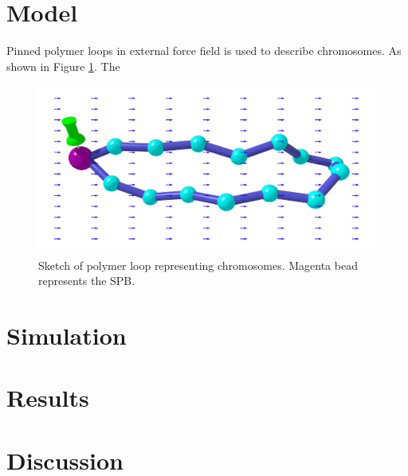 \documentclass[12pt,a4paper]{article}
\begin{document}
\section{Model}
\label{sec:model}
Pinned polymer loops in external force field is used to describe chromosomes.
As shown in Figure \ref{fig:sketch}. The 
\begin{figure}[htpb]
	\centering
	\includegraphics[width=0.8\linewidth]{sketch}
	\caption{Sketch of polymer loop representing chromosomes. Magenta bead
		represents the SPB.}
	\label{fig:sketch}
\end{figure}

\section{Simulation}
\label{sec:simulation}

\section{Results}
\label{sec:results}

\section{Discussion}
\label{sec:discussion}
\end{document}
